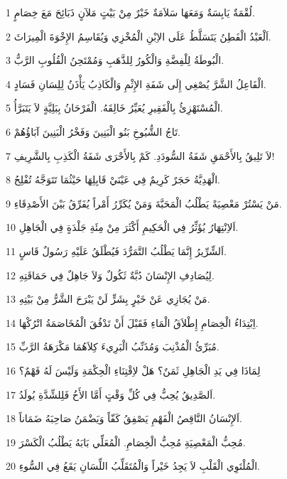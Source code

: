 \par 1 لُقْمَةٌ يَابِسَةٌ وَمَعَهَا سَلاَمَةٌ خَيْرٌ مِنْ بَيْتٍ مَلآنٍ ذَبَائِحَ مَعَ خِصَامٍ.
\par 2 اَلْعَبْدُ الْفَطِنُ يَتَسَلَّطُ عَلَى الاِبْنِ الْمُخْزِي وَيُقَاسِمُ الإِخْوَةَ الْمِيرَاثَ.
\par 3 الْبُوطَةُ لِلْفِضَّةِ وَالْكُورُ لِلذَّهَبِ وَمُمْتَحِنُ الْقُلُوبِ الرَّبُّ.
\par 4 الْفَاعِلُ الشَّرَّ يُصْغِي إِلَى شَفَةِ الإِثْمِ وَالْكَاذِبُ يَأْذَنُ لِلِسَانِ فَسَادٍ.
\par 5 الْمُسْتَهْزِئُ بِالْفَقِيرِ يُعَيِّرُ خَالِقَهُ. الْفَرْحَانُ بِبَلِيَّةٍ لاَ يَتَبَرَّأُ.
\par 6 تَاجُ الشُّيُوخِ بَنُو الْبَنِينَ وَفَخْرُ الْبَنِينَ آبَاؤُهُمْ.
\par 7 لاَ تَلِيقُ بِالأَحْمَقِ شَفَةُ السُّودَدِ. كَمْ بِالأَحْرَى شَفَةُ الْكَذِبِ بِالشَّرِيفِ!
\par 8 الْهَدِيَّةُ حَجَرٌ كَرِيمٌ فِي عَيْنَيْ قَابِلِهَا حَيْثُمَا تَتَوَجَّهُ تُفْلِحُ.
\par 9 مَنْ يَسْتُرْ مَعْصِيَةً يَطْلُبُ الْمَحَبَّةَ وَمَنْ يُكَرِّرُ أَمْراً يُفَرِّقُ بَيْنَ الأَصْدِقَاءِ.
\par 10 اَلاِنْتِهَارُ يُؤَثِّرُ فِي الْحَكِيمِ أَكْثَرَ مِنْ مِئَةِ جَلْدَةٍ فِي الْجَاهِلِ.
\par 11 اَلشِّرِّيرُ إِنَّمَا يَطْلُبُ التَّمَرُّدَ فَيُطْلَقُ عَلَيْهِ رَسُولٌ قَاسٍ.
\par 12 لِيُصَادِفِ الإِنْسَانَ دُبَّةٌ ثَكُولٌ وَلاَ جَاهِلٌ فِي حَمَاقَتِهِ.
\par 13 مَنْ يُجَازِي عَنْ خَيْرٍ بِشَرٍّ لَنْ يَبْرَحَ الشَّرُّ مِنْ بَيْتِهِ.
\par 14 اِبْتِدَاءُ الْخِصَامِ إِطْلاَقُ الْمَاءِ فَقَبْلَ أَنْ تَدْفُقَ الْمُخَاصَمَةُ اتْرُكْهَا.
\par 15 مُبَرِّئُ الْمُذْنِبَ وَمُذَنِّبُ الْبَرِيءَ كِلاَهُمَا مَكْرَهَةُ الرَّبِّ.
\par 16 لِمَاذَا فِي يَدِ الْجَاهِلِ ثَمَنٌ؟ هَلْ لاِقْتِنَاءِ الْحِكْمَةِ وَلَيْسَ لَهُ فَهْمٌ؟
\par 17 اَلصَّدِيقُ يُحِبُّ فِي كُلِّ وَقْتٍ أَمَّا الأَخُ فَلِلشِّدَّةِ يُولَدُ.
\par 18 اَلإِنْسَانُ النَّاقِصُ الْفَهْمِ يَصْفِقُ كَفّاً وَيَضْمَنُ صَاحِبَهُ ضَمَاناً.
\par 19 مُحِبُّ الْمَعْصِيَةِ مُحِبُّ الْخِصَامِ. الْمُعَلِّي بَابَهُ يَطْلُبُ الْكَسْرَ.
\par 20 الْمُلْتَوِي الْقَلْبِ لاَ يَجِدُ خَيْراً وَالْمُتَقَلِّبُ اللِّسَانِ يَقَعُ فِي السُّوءِ.

